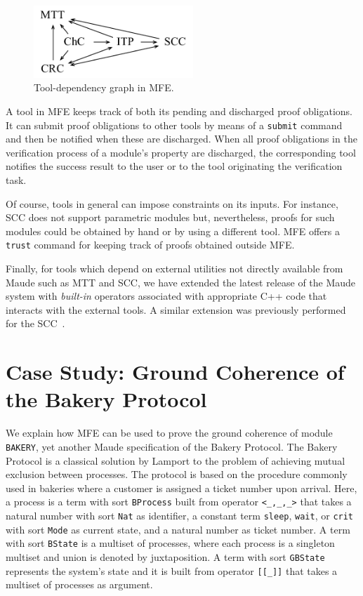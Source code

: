 \documentclass{llncs}
\begin{document}
\begin{figure}%
\begin{center}
\includegraphics[width=6cm]{tool-dep}
\caption{Tool-dependency graph in MFE.}
\label{fig.tool-dep}
\end{center}
\end{figure}

\vspace{-0.8cm}

A tool in MFE keeps track of both its pending and discharged proof obligations.
It can submit proof obligations to other tools by means of a {\tt submit} command
and then be notified when these are discharged. When all proof obligations
in the verification process of a module's property are discharged, the corresponding tool notifies 
the success result to the user or to the tool originating the verification task.

Of course, tools in general can impose constraints on its inputs. For instance, 
SCC does not support parametric modules but, nevertheless, proofs for such modules
could be obtained by hand or by using a different tool. MFE offers
a {\tt trust} command for keeping track of proofs obtained outside MFE.

Finally, for tools which depend on external
utilities not directly available from Maude such as MTT and SCC, 
we have extended the latest release of the Maude system
with {\em built-in} operators associated with appropriate
C++ code that interacts with the external tools.
A similar extension was previously performed for 
the SCC~\cite{Hendrix:2008}.

\section{Case Study: Ground Coherence of the Bakery Protocol}
\label{sec.case}

We explain how MFE can be used to prove the ground coherence of
module \verb"BAKERY", yet another Maude specification of the Bakery Protocol.
The Bakery Protocol is a classical solution by Lamport to the problem 
of achieving mutual exclusion between processes.
The protocol is based on the procedure commonly used in bakeries
where a customer is assigned a ticket number upon arrival.
Here, a process is a term with sort \verb"BProcess" built from operator
\verb"<_,_,_>" that takes a natural number with sort \verb"Nat"
as identifier, a constant term \verb"sleep", \verb"wait", or \verb"crit"
with sort \verb"Mode" as current state, and
a natural number as ticket number.
A term with sort \verb"BState" is a multiset of processes,
where each process is a singleton multiset and union is denoted by juxtaposition.
A term with sort \verb"GBState" represents the system's state
and it is built
from operator \verb"[[_]]" that takes a multiset of processes as argument.
\end{document}
